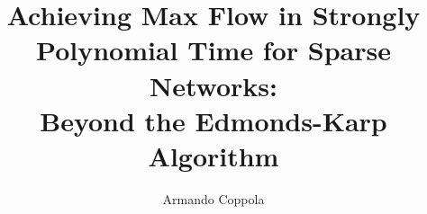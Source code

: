 \documentclass[binding=0.6cm, noexaminfo]{sapthesis}
\title{Achieving Max Flow in Strongly Polynomial Time for Sparse Networks:\\Beyond the Edmonds-Karp Algorithm}
\author{Armando Coppola}
\theoremstyle{definition}
\newcommand{\say}[1]{\flqq\textit{#1}\frqq}
\begin{document}
\lstset{language=Python}

\frontmatter

\maketitle


\dedication{\say{Computer Science is no more about computers \\than astronomy is about telescopes}\\― Edsger W. Dijkstra }



\cleardoublepage

\tableofcontents
\let\cleardoublepage\clearpage

\hypersetup{colorlinks=true, linkcolor=blue, citecolor=red}


\mainmatter







% 





\backmatter
{}

% 
% 
\printbibliography
\end{document}
